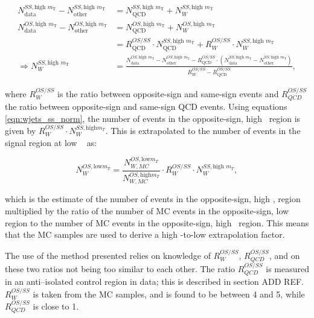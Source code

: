 \begin{equation}\label{eqn:wjets_ss_norm}
\begin{split}
N_{\text{data}}^{SS, \text{high } m_{\text{T}}} - N_{\text{other}}^{SS,
\text{high } m_{\text{T}}} & =
N_{\text{QCD}}^{SS, \text{high } m_{\text{T}}} + N_{W}^{SS, \text{high } m_{\text{T}}} ~\\
N_{\text{data}}^{OS, \text{high } m_{\text{T}}} - N_{\text{other}}^{OS,
\text{high } m_{\text{T}}} & = N_{\text{QCD}}^{OS, \text{high } m_{\text{T}}} +
N_{W}^{OS, \text{high } m_{\text{T}}} \\
& = R_{\text{QCD}}^{OS/SS}\cdot N_{\text{QCD}}^{SS, \text{high } m_{\text{T}}} +
R_{W}^{OS/SS} \cdot N_{W}^{SS, \text{high } m_{\text{T}}} ~\\
\Rightarrow N_{W}^{SS, \text{high } m_{\text{T}}}  &= \frac{N_{\text{data}}^{OS,
\text{high } m_{\text{T}}}  - N_{\text{other}}^{OS, \text{high } m_{\text{T}}}  -
R_{\text{QCD}}^{OS/SS}\cdot(N_{\text{data}}^{SS, \text{high } m_{\text{T}}}  -
N_{\text{other}}^{SS, \text{high } m_{\text{T}}} )}{R_{W}^{OS/SS} -
R_{\text{QCD}}^{OS/SS}} ,
\end{split}
\end{equation}

where $R_{W}^{OS/SS}$ is the ratio between opposite-sign and same-sign \Wjets events
and $R_{QCD}^{OS/SS}$ the ratio between opposite-sign and same-sign QCD events. Using 
equations \ref{eqn:wjets_ss_norm}, the number of \Wjets events in the
opposite-sign, high \mT~region is given by $R_{W}^{OS/SS}\cdot N_{W}^{SS,\text{high} m_{T}}$. 
This is extrapolated to the number of \Wjets events in the signal region at low \mT~ as:

\begin{equation}\label{eqn:wjets_os_norm}
N_{W}^{OS,\text{low} m_{T}} = \frac{N_{W,MC}^{OS,\text{low} m_{T}}}{N_{W,MC}^{OS,\text{high} m_{T}}}\cdot R_{W}^{OS/SS} \cdot N_W^{SS,\text{high }m_{T}},
\end{equation}

which is the estimate of the number of \Wjets events in the opposite-sign, high \mT, region
multiplied by the ratio of the number of \ac{MC} events in the opposite-sign, low \mT~ region to the number of \ac{MC} events in the opposite-sign, high \mT~region. This means that
the \ac{MC} samples are used to derive a high \mT-to-low \mT extrapolation factor.

The use of the method presented relies on knowledge of $R_{W}^{OS/SS}$,
$R_{QCD}^{OS/SS}$, and on these two ratios not being too similar to each other. 
The ratio $R_{QCD}^{OS/SS}$ is measured in an anti--isolated
control region in data; this is described in section ADD REF. $R_{W}^{OS/SS}$ is 
taken from the \Wjets \ac{MC} samples, and is found to be between 4 and 5, while $R_{QCD}^{OS/SS}$
is close to 1.

